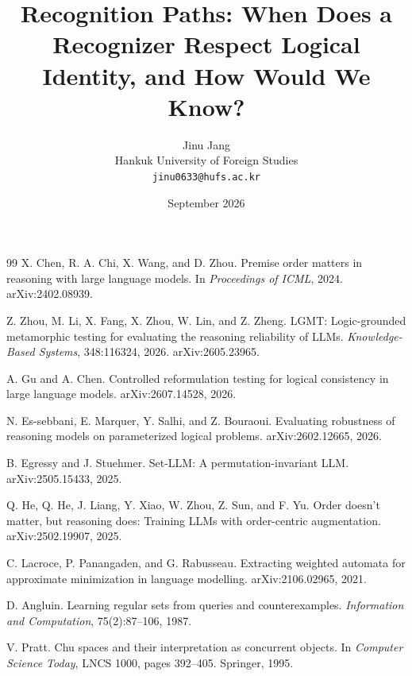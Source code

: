 \documentclass[10pt]{article}
\title{Recognition Paths: When Does a Recognizer Respect Logical Identity, and How Would We Know?}
\author{Jinu Jang\\
Hankuk University of Foreign Studies\\
\texttt{jinu0633@hufs.ac.kr}}
\date{September 2026}
\begin{document}
\maketitle


\begin{thebibliography}{99}
X. Chen, R. A. Chi, X. Wang, and D. Zhou.
Premise order matters in reasoning with large language models.
In \emph{Proceedings of ICML}, 2024. arXiv:2402.08939.

Z. Zhou, M. Li, X. Fang, X. Zhou, W. Lin, and Z. Zheng.
LGMT: Logic-grounded metamorphic testing for evaluating the reasoning reliability of LLMs.
\emph{Knowledge-Based Systems}, 348:116324, 2026. arXiv:2605.23965.

A. Gu and A. Chen.
Controlled reformulation testing for logical consistency in large language models.
arXiv:2607.14528, 2026.

N. Es-sebbani, E. Marquer, Y. Salhi, and Z. Bouraoui.
Evaluating robustness of reasoning models on parameterized logical problems.
arXiv:2602.12665, 2026.

B. Egressy and J. Stuehmer.
Set-LLM: A permutation-invariant LLM.
arXiv:2505.15433, 2025.

Q. He, Q. He, J. Liang, Y. Xiao, W. Zhou, Z. Sun, and F. Yu.
Order doesn't matter, but reasoning does: Training LLMs with order-centric augmentation.
arXiv:2502.19907, 2025.

C. Lacroce, P. Panangaden, and G. Rabusseau.
Extracting weighted automata for approximate minimization in language modelling.
arXiv:2106.02965, 2021.

D. Angluin.
Learning regular sets from queries and counterexamples.
\emph{Information and Computation}, 75(2):87--106, 1987.

V. Pratt.
Chu spaces and their interpretation as concurrent objects.
In \emph{Computer Science Today}, LNCS 1000, pages 392--405. Springer, 1995.
\end{thebibliography}
\end{document}
